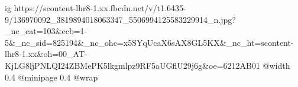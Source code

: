  
 
 
 
 

\ifcmt
  ig https://scontent-lhr8-1.xx.fbcdn.net/v/t1.6435-9/136970092_3819894018063347_5506994125583229914_n.jpg?_nc_cat=103&ccb=1-5&_nc_sid=825194&_nc_ohc=x5SYqUcaX6sAX8GL5KX&_nc_ht=scontent-lhr8-1.xx&oh=00_AT-KjLG8ljPNLQI24ZBMePK5lkgmlpz9RF5aUGflU29j6g&oe=6212AB01
  @width 0.4
  @minipage 0.4
  @wrap \parpic[r]
\fi
